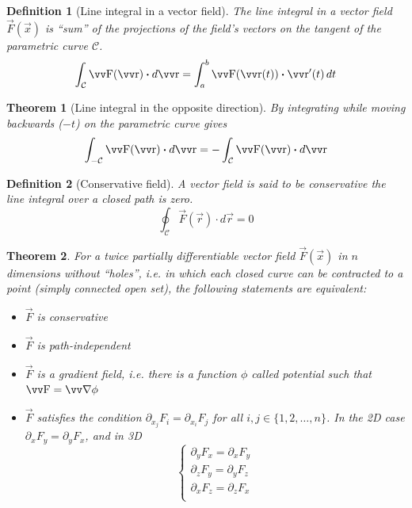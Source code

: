 \documentclass[twocolumn, margin=small]{tex/hsrzf}
\theoremstyle{fuvarzf}
\newtheorem{theorem}{Theorem}
\newtheorem{definition}{Definition}
\begin{document}
\begin{definition}[Line integral in a vector field]
  The line integral in a vector field \(\vec{F}(\vec{x})\) is ``sum'' of the
  projections of the field's vectors on the tangent of the parametric curve
  \(\mathcal{C}\).
  \[
    \int_\mathcal{C} \vec{F}(\vec{r})\dotp d\vec{r}
    = \int_a^b \vec{F}(\vec{r}(t))\dotp \vec{r}'(t) \,dt
  \]
\end{definition}

\begin{theorem}[Line integral in the opposite direction]
  By integrating while moving backwards (\(-t\)) on the parametric curve gives
  \[
    \int_{-\mathcal{C}} \vec{F}(\vec{r})\dotp d\vec{r}
    = -\int_{\mathcal{C}} \vec{F}(\vec{r})\dotp d\vec{r}
  \]
\end{theorem}

\begin{definition}[Conservative field]
  A vector field is said to be \emph{conservative} the line integral over a
  closed path is zero.
  \[
    \oint_\mathcal{C} \vec{F}(\vec{r})\cdot d\vec{r} = 0
  \]
\end{definition}

\begin{theorem}
  For a twice partially differentiable vector field \(\vec{F}(\vec{x})\) in
  \(n\) dimensions without ``holes'', i.e. in which each closed curve can be
  contracted to a point (simply connected open set), the following statements
  are equivalent:
  \begin{itemize}
    \item \(\vec{F}\) is conservative
    \item \(\vec{F}\) is path-independent
    \item \(\vec{F}\) is a \emph{gradient field}, i.e. there is a
      function \(\phi\) called \emph{potential} such that \(\vec{F} = \grad
      \phi\)
    \item \(\vec{F}\) satisfies the condition \(\partial_{x_j} F_i =
      \partial_{x_i} F_j\) for all \(i,j \in \{1,2,\ldots,n\}\). In the 2D case
      \(\partial_x F_y = \partial_y F_x\), and in 3D
      \[
        \begin{cases}
          \partial_y F_x = \partial_x F_y \\
          \partial_z F_y = \partial_y F_z \\
          \partial_x F_z = \partial_z F_x \\
        \end{cases}
      \]
  \end{itemize}
\end{theorem}
\end{document}
